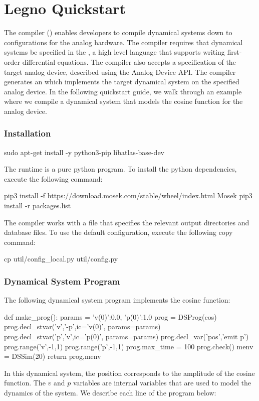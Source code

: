 \chapter{Legno Quickstart}

The \legno compiler () enables developers to compile dynamical
systems down to configurations for the analog hardware. The \legno compiler
requires that dynamical systems be specified in the , a high level language that supports writing first-order
differential equations. The \legno compiler also accepts a specification of the
target analog device, described using the Analog Device API. The \legno compiler
generates an  which implements the target dynamical
system on the specified analog device. In the following quickstart guide, we
walk through an example where we compile a dynamical system that models the
cosine function for the \hcdc analog device. 

\subsection{Installation}

\begin{snippet}
  sudo apt-get install -y python3-pip libatlas-base-dev
\end{snippet}

The \grendel runtime is a pure python program. To install the python
dependencies, execute the following command:

\begin{snippet}
  pip3 install -f https://download.mosek.com/stable/wheel/index.html Mosek
  pip3 install -r packages.list
\end{snippet}

The \legno compiler works with a 
file that specifies the relevant output directories and database files. To use
the default configuration, execute the following copy command:

\begin{snippet}
cp util/config_local.py util/config.py
\end{snippet}

\subsection{Dynamical System Program}
The following dynamical system program implements the cosine function:
\begin{dssnippet}
def make_prog():
  params = {
    'v(0)':0.0,
    'p(0)':1.0
  }
  prog = DSProg(cos)
  prog.decl_stvar('v','-p',ic='{v(0)}', params=params)
  prog.decl_stvar('p','v',ic='{p(0)}', params=params)
  prog.decl_var('pos','emit p')
  prog.range('v',-1,1)
  prog.range('p',-1,1)
  prog.max_time = 100
  prog.check()
  menv = DSSim(20)
  return prog,menv
  
\end{dssnippet}
In this dynamical system, the position  corresponds to the amplitude of
the cosine function. The $v$ and $p$ variables are internal variables that are
used to model the dynamics of the system. We describe each line of the program
below:

